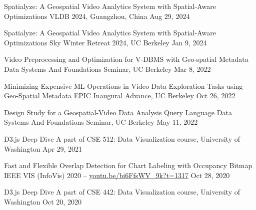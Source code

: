 

\begin{cvpubs}

  \cvpub
    {Spatialyze: A Geospatial Video Analytics System with Spatial-Aware Optimizations} %
    {VLDB 2024, Guangzhou, China} %
    {Aug 29, 2024} %
    {} %

  \cvpub
    {Spatialyze: A Geospatial Video Analytics System with Spatial-Aware Optimizations} %
    {Sky Winter Retreat 2024, UC Berkeley} %
    {Jan 9, 2024} %
    {} %

  \cvpub
    {Video Preprocessing and Optimization for V-DBMS with Geo-spatial Metadata} %
    {Data Systems And Foundations Seminar, UC Berkeley} %
    {Mar 8, 2022} %
    {} %

  \cvpub
    {Minimizing Expensive ML Operations in Video Data Exploration Tasks using Geo-Spatial Metadata} %
    {EPIC Inaugural Advance, UC Berkeley} %
    {Oct 26, 2022} %
    {} %

  \cvpub
    {Design Study for a Geospatial-Video Data Analysis Query Language} %
    {Data Systems And Foundations Seminar, UC Berkeley} %
    {May 11, 2022} %
    {} %

  \cvpub
    {D3.js Deep Dive} %
    {A part of CSE 512: Data Visualization course, University of Washington} %
    {Apr 29, 2021} %
    {} %
    
  \cvpub
    {Fast and Flexible Overlap Detection for Chart Labeling with Occupancy Bitmap} %
    {IEEE VIS (InfoVis) 2020  --  \href{https://youtu.be/bi6FfsWV_9k?t=1317}{youtu.be/bi6FfsWV\_9k?t=1317}} %
    {Oct 28, 2020} %
    {} %

  \cvpub
    {D3.js Deep Dive} %
    {A part of CSE 442: Data Visualization course, University of Washington} %
    {Oct 20, 2020} %
    {} %
\end{cvpubs}
